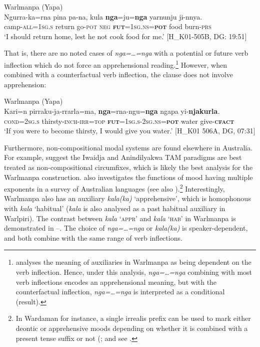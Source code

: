 \documentclass[output=paper,colorlinks,citecolor=brown]{langscibook}
\begin{document}
\ea 
\textnormal{Warlmanpa (Yapa)} \\
\gll Ngurra-ka=rna pina pa-na, kula \textbf{nga}=ju=\textbf{nga} yarnunju ji-nnya. \\
camp-\textsc{all=1sg.s} return go-\textsc{pot} \textsc{neg} \textsc{\textbf{fut}=1sg.ns=\textbf{pot}} food burn-\textsc{prs} \\
\glt `I should return home, lest he not cook food for me.' $[$H\_K01-505B, DG: 19:51$]$
\label{ex:bro56}
\z

\noindent That is, there are no noted cases of \textit{nga=\ldots=nga} with a potential or future verb inflection which do not force an apprehensional reading.\footnote{\citet{nash_grammatical_1979} analyses the meaning of auxiliaries in Warlmanpa as being dependent on the verb inflection. Hence, under this analysis, \textit{nga=\ldots=nga} combining with most verb inflections encodes an apprehensional meaning, but with the counterfactual inflection, \textit{nga=\ldots=nga} is interpreted as a conditional (result).} However, when combined with a counterfactual verb inflection, the clause does not involve apprehension:

\ea 
\textnormal{Warlmanpa (Yapa)} \\
\gll Kari=n pirraku-ja-rrarla=ma, \textbf{nga}=rna-ngu=\textbf{nga} ngapa yi-\textbf{njakurla}. \\
\textsc{cond=2sg.s} thirsty-\textsc{inch-irr=top} \textsc{\textbf{fut}=1sg.s-2sg.ns=\textbf{pot}} water give-\textsc{\textbf{cfact}} \\
\glt `If you were to become thirsty, I would give you water.' $[$H\_K01 506A, DG, 07:31$]$
\label{ex:bro}
\z

 Furthermore, non-compositional modal systems are found elsewhere in Australia. For example, \citet{caudal_comparative_2019} suggest the Iwaidja and Anindilyakwa TAM paradigms are best treated as non-compositional circumfixes, which is likely the best analysis for the Warlmanpa construction. \citet{verstraete_semantics_2005} also investigates the functions of mood having multiple exponents in a survey of Australian languages (see also \cite{legate_morpho-semantics_2003,iatridou_grammatical_2000,romero_fake_2014,caudal_polyfunctionality_2016}).\footnote{In Wardaman for instance, a single irrealis prefix can be used to mark either deontic or apprehensive moods depending on whether it is combined with a present tense suffix or not (\cite[179]{merlan_grammar_1994}; and see \cite[224--225]{verstraete_semantics_2005}.} Interestingly, Warlmanpa also has an auxiliary \textit{kala(ka)} `apprehensive', which is homophonous with \textit{kala} `habitual' (\textit{kala} is also analysed as a past habitual auxiliary in Warlpiri). The contrast between \textit{kala} \textsc{`appr'} and \textit{kala} \textsc{`hab'} in Warlmanpa is demonstrated in --. The choice of \textit{nga=\ldots=nga} or \textit{kala(ka)} is speaker-dependent, and both combine with the same range of verb inflections.
\end{document}
